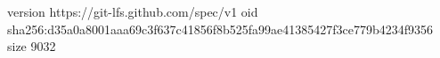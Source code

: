 version https://git-lfs.github.com/spec/v1
oid sha256:d35a0a8001aaa69c3f637c41856f8b525fa99ae41385427f3ce779b4234f9356
size 9032
